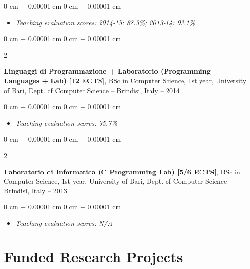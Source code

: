 \documentclass[10pt, a4paper]{article}
\newenvironment{highlights}{
    \begin{itemize}[
        topsep=0.10 cm,
        parsep=0.10 cm,
        partopsep=0pt,
        itemsep=0pt,
        leftmargin=0 cm + 10pt
    ]
}{
    \end{itemize}
} %
\newenvironment{onecolentry}{
    \begin{adjustwidth}{
        0 cm + 0.00001 cm
    }{
        0 cm + 0.00001 cm
    }
}{
    \end{adjustwidth}
} %
\newenvironment{twocolentry}[2][]{
    \onecolentry
    \def\secondColumn{#2}
    \setcolumnwidth{\fill, 4.5 cm}
    \begin{paracol}{2}
}{
    \switchcolumn \raggedleft \secondColumn
    \end{paracol}
    \endonecolentry
} %
\begin{document}
        \vspace{0.10 cm}
        \begin{onecolentry}
            \begin{highlights}
                \item \textit{Teaching evaluation scores: 2014-15: 88.3\%; 2013-14: 93.1\%}
            \end{highlights}
        \end{onecolentry}


        \vspace{0.2 cm}

        \begin{twocolentry}{
            2013 – 2014
        }
            \textbf{Linguaggi di Programmazione + Laboratorio (Programming Languages + Lab) [12 ECTS]}, BSc in Computer Science, 1st year, University of Bari, Dept. of Computer Science -- Brindisi, Italy\end{twocolentry}

        \vspace{0.10 cm}
        \begin{onecolentry}
            \begin{highlights}
                \item \textit{Teaching evaluation scores: 95.7\%}
            \end{highlights}
        \end{onecolentry}


        \vspace{0.2 cm}

        \begin{twocolentry}{
            2008 – 2013
        }
            \textbf{Laboratorio di Informatica (C Programming Lab) [5/6 ECTS]}, BSc in Computer Science, 1st year, University of Bari, Dept. of Computer Science -- Brindisi, Italy\end{twocolentry}

        \vspace{0.10 cm}
        \begin{onecolentry}
            \begin{highlights}
                \item \textit{Teaching evaluation scores: N/A}
            \end{highlights}
        \end{onecolentry}



    
    \section{Funded Research Projects}
\end{document}
